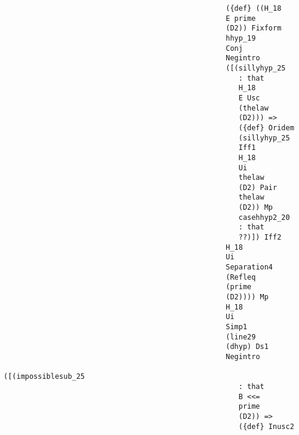\documentclass[12pt]{article}
\begin{document}
\begin{verbatim}
                                                    ({def} ((H_18 
                                                    E prime 
                                                    (D2)) Fixform 
                                                    hhyp_19 
                                                    Conj 
                                                    Negintro 
                                                    ([(sillyhyp_25 
                                                       : that 
                                                       H_18 
                                                       E Usc 
                                                       (thelaw 
                                                       (D2))) => 
                                                       ({def} Oridem 
                                                       (sillyhyp_25 
                                                       Iff1 
                                                       H_18 
                                                       Ui 
                                                       thelaw 
                                                       (D2) Pair 
                                                       thelaw 
                                                       (D2)) Mp 
                                                       casehhyp2_20 
                                                       : that 
                                                       ??)]) Iff2 
                                                    H_18 
                                                    Ui 
                                                    Separation4 
                                                    (Refleq 
                                                    (prime 
                                                    (D2)))) Mp 
                                                    H_18 
                                                    Ui 
                                                    Simp1 
                                                    (line29 
                                                    (dhyp) Ds1 
                                                    Negintro 
                                                    ([(impossiblesub_25 
                                                       : that 
                                                       B <<= 
                                                       prime 
                                                       (D2)) => 
                                                       ({def} Inusc2 

\end{verbatim}
\end{document}
